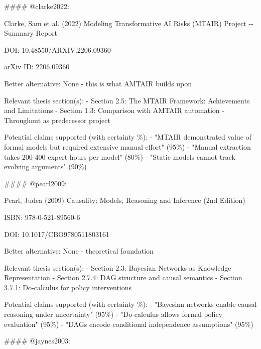 \documentclass[
  11pt,
  letterpaper,
]{book}
\newenvironment{Shaded}{\begin{snugshade}}{\end{snugshade}}
\newcommand{\FunctionTok}[1]{\textcolor[rgb]{0.28,0.35,0.67}{#1}}
\newcommand{\InformationTok}[1]{\textcolor[rgb]{0.37,0.37,0.37}{#1}}
\begin{document}
\begin{Shaded}
\begin{Highlighting}[]
\FunctionTok{\#\#\#\# \textasciigrave{}@clarke2022\textasciigrave{}: }

\InformationTok{    Clarke, Sam et al. (2022)}
\InformationTok{    Modeling Transformative AI Risks (MTAIR) Project {-}{-} Summary Report}

\InformationTok{    DOI: 10.48550/ARXIV.2206.09360}

\InformationTok{    arXiv ID: 2206.09360}

\InformationTok{    Better alternative: None {-} this is what AMTAIR builds upon}

\InformationTok{    Relevant thesis section(s):}
\InformationTok{    {-} Section 2.5: The MTAIR Framework: Achievements and Limitations}
\InformationTok{    {-} Section 1.3: Comparison with AMTAIR automation}
\InformationTok{    {-} Throughout as predecessor project}

\InformationTok{    Potential claims supported (with certainty \%):}
\InformationTok{    {-} "MTAIR demonstrated value of formal models but required extensive manual effort" (95\%)}
\InformationTok{    {-} "Manual extraction takes 200{-}400 expert hours per model" (80\%)}
\InformationTok{    {-} "Static models cannot track evolving arguments" (90\%)}

\FunctionTok{\#\#\#\# \textasciigrave{}@pearl2009\textasciigrave{}: }

\InformationTok{    Pearl, Judea (2009)}
\InformationTok{    Causality: Models, Reasoning and Inference (2nd Edition)}

\InformationTok{    ISBN: 978{-}0{-}521{-}89560{-}6}

\InformationTok{    DOI: 10.1017/CBO9780511803161}

\InformationTok{    Better alternative: None {-} theoretical foundation}

\InformationTok{    Relevant thesis section(s):}
\InformationTok{    {-} Section 2.3: Bayesian Networks as Knowledge Representation}
\InformationTok{    {-} Section 2.7.4: DAG structure and causal semantics}
\InformationTok{    {-} Section 3.7.1: Do{-}calculus for policy interventions}

\InformationTok{    Potential claims supported (with certainty \%):}
\InformationTok{    {-} "Bayesian networks enable causal reasoning under uncertainty" (95\%)}
\InformationTok{    {-} "Do{-}calculus allows formal policy evaluation" (95\%)}
\InformationTok{    {-} "DAGs encode conditional independence assumptions" (95\%)}

\FunctionTok{\#\#\#\# \textasciigrave{}@jaynes2003\textasciigrave{}: }


\end{Highlighting}
\end{Shaded}
\end{document}

